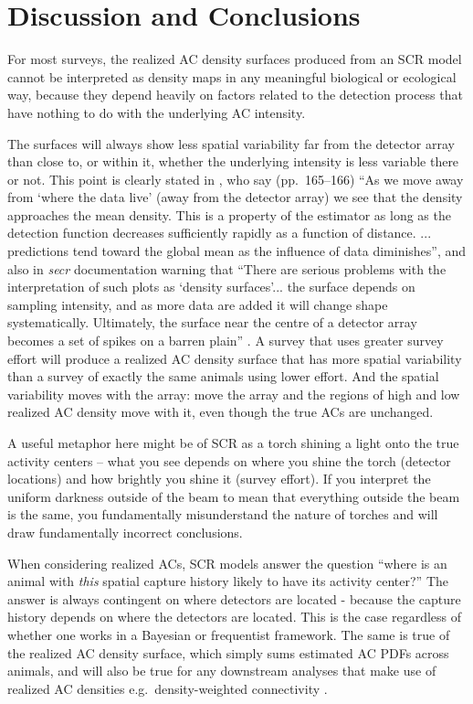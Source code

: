\documentclass[useAMS,usenatbib,referee]{biom}
\begin{document}
\section{Discussion and Conclusions} \label{discussion}
For most surveys, the realized AC density surfaces produced from an SCR model cannot be interpreted as density maps in any meaningful biological or ecological way, because they depend heavily on factors related to the detection process that have nothing to do with the underlying AC intensity. 

The surfaces will always show less spatial variability far from the detector array than close to, or within it, whether the underlying intensity is less variable there or not. This point is clearly stated in \cite{Royle+al:13a}, who say (pp.\ 165--166) ``As we move away from `where the data live' (away from the detector array) we see that the density approaches the mean density. This is a property of the estimator as long as the detection function decreases sufficiently rapidly as a function of distance. ... predictions tend toward the global mean as the influence of data diminishes'', and also in \textit{secr} documentation warning that ``There are serious problems with the interpretation of such plots as `density surfaces'... the surface depends on sampling intensity, and as more data are added it will change shape systematically. Ultimately, the surface near the centre of a detector array becomes a set of spikes on a barren plain'' \citep{secr:22}. A survey that uses greater survey effort will produce a realized AC density surface that has more spatial variability than a survey of exactly the same animals using lower effort. And the spatial variability moves with the array: move the array and the regions of high and low realized AC density move with it, even though the true ACs are unchanged.

A useful metaphor here might be of SCR as a torch shining a light onto the true activity centers -- what you see depends on where you shine the torch (detector locations) and how brightly you shine it (survey effort). If you interpret the uniform darkness outside of the beam to mean that everything outside the beam is the same, you fundamentally misunderstand the nature of torches and will draw fundamentally incorrect conclusions.

When considering realized ACs, SCR models answer the question ``where is an animal with {\it this} spatial capture history likely to have its activity center?'' The answer is always contingent on where detectors are located - because the capture history depends on where the detectors are located. This is the case regardless of whether one works in a Bayesian or frequentist framework. The same is true of the realized AC density surface, which simply sums estimated AC PDFs across animals, and will also be true for any downstream analyses that make use of realized AC densities e.g.\ density-weighted connectivity \citep{Morin2017}.
\end{document}
